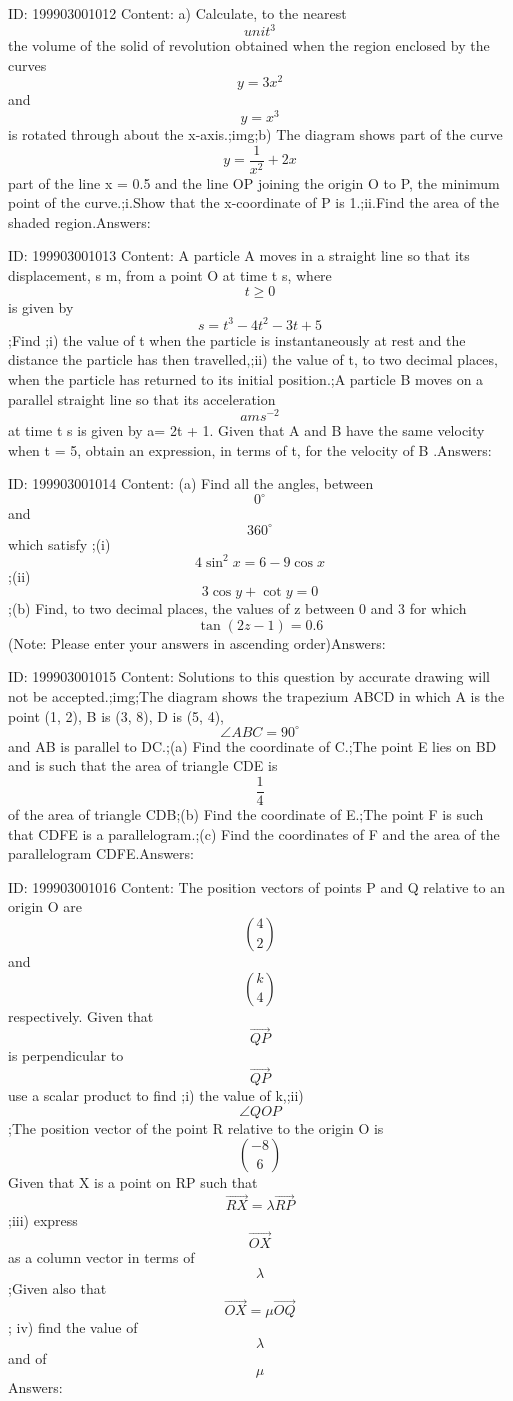\documentclass{article}
\begin{document}
ID: 199903001012
Content:
a) Calculate, to the nearest \[unit^3\] the volume of the solid of revolution obtained when the region enclosed by the curves \[y=3x^2\]and \[y=x^3\] is rotated through about the x-axis.;img;b) The diagram shows part of the curve \[y=\frac{1}{x^{2}}+2x\] part of the line x = 0.5 and the line OP joining the origin O to P, the minimum point of the curve.;i.Show that the x-coordinate of P is 1.;ii.Find the area of the shaded region.Answers:

ID: 199903001013
Content:
A particle A moves in a straight line so that its displacement, s m, from a point O at time t s, where \[t\geq 0\] is given by \[s=t^3-4t^2-3t+5\];Find ;i) the value of t when the particle is instantaneously at rest and the distance the particle has then travelled,;ii) the value of t, to two decimal places, when the particle has returned to its initial position.;A particle B moves on a parallel straight line so that its acceleration \[a ms^{-2}\] at time t s is given by a= 2t + 1. Given that A and B have the same velocity when t = 5, obtain an expression, in terms of t, for the velocity of B .Answers:

ID: 199903001014
Content:
(a) Find all the angles, between \[0^{\circ}\] and \[360^{\circ}\] which satisfy ;(i) \[4\sin^2x=6-9\cos x\];(ii) \[3 \cos y + \cot y = 0\];(b) Find, to two decimal places, the values of z between 0 and 3 for which \[\tan(2z -1) = 0.6\] (Note: Please enter your answers in ascending order)Answers:

ID: 199903001015
Content:
Solutions to this question by accurate drawing will not be accepted.;img;The diagram shows the trapezium ABCD in which A is the point (1, 2), B is (3, 8), D is (5, 4), \[\angle ABC=90^{\circ}\] and AB is parallel to DC.;(a)	Find the coordinate of C.;The point E lies on BD and is such that the area of triangle CDE is \[\frac{1}{4}\] of the area of triangle CDB;(b)	Find the coordinate of E.;The point F is such that CDFE is a parallelogram.;(c) Find the coordinates of F and the area of the parallelogram CDFE.Answers:

ID: 199903001016
Content:
The position vectors of points P and Q relative to an origin O are \[\binom{4}{2}\] and \[\binom{k}{4}\]respectively. Given that \[\vec{QP}\] is perpendicular to \[\vec{QP}\] use a scalar product to find ;i) the value of k,;ii) \[\angle QOP\];The position vector of the point R relative to the origin O is \[\binom{-8}{6}\] Given that X is a point on RP such that \[\vec{RX}=\lambda \vec{RP}\];iii) express \[\vec{OX}\] as a column vector in terms of \[\lambda\];Given also that \[\vec{OX}=\mu \vec{OQ}\];  iv) find the value of \[\lambda\] and of \[\mu\]Answers:
\end{document}
